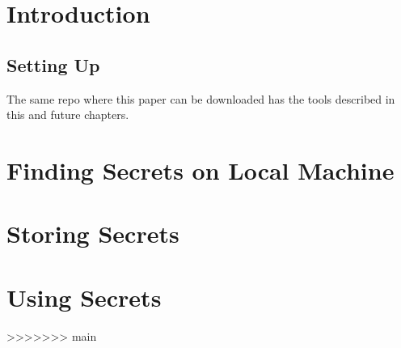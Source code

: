 \documentclass[11pt]{report}
\begin{document}
	
	\chapter{Introduction}
	\lipsum[1]
	
	\section{Setting Up}
	
	The same repo where this paper can be downloaded has the tools described in this and future chapters.
	
	\chapter{Finding Secrets on Local Machine}
	
	\lipsum[1]
	
	\chapter{Storing Secrets}
	
	\lipsum[1]
	
	\chapter{Using Secrets}
	
	\lipsum[1]
	
>>>>>>> main
\end{document}
